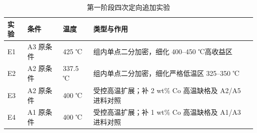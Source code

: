 \begin{table}[H]
  \centering
  \caption{第一阶段四次定向追加实验}
  \label{tab:q4-phase-one}
  \small
  \begin{tabularx}{\textwidth}{C{0.09\textwidth}C{0.18\textwidth}C{0.13\textwidth}X}
    \toprule
    实验 & 条件 & 温度 & 类型与作用 \\
    \midrule
    E1 & A3 原条件 & 425 ℃ & 组内单点二分加密，细化 400--450 ℃高收益区 \\
    E2 & A2 原条件 & 337.5 ℃ & 组内单点二分加密，细化严格低温区 325--350 ℃ \\
    E3 & A2 原条件 & 400 ℃ & 受控高温扩展；补 2 wt\% Co 高温缺格及 A2/A5 进料对照 \\
    E4 & A1 原条件 & 400 ℃ & 受控高温扩展；补 1 wt\% Co 高温缺格及 A1/A3 进料对照 \\
    \bottomrule
  \end{tabularx}
\end{table}
